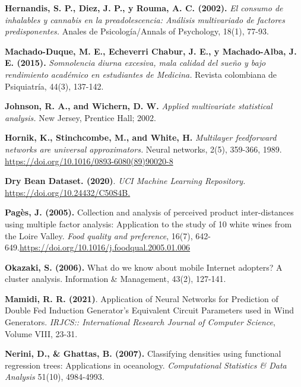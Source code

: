 \begin{thebibliography}{99}
\textbf{Hernandis, S. P., Diez, J. P., y Rouma, A. C. (2002).} \textit{El consumo de inhalables y cannabis en la preadolescencia: Análisis multivariado de factores predisponentes.} Anales de Psicología/Annals of Psychology, 18(1), 77-93.

 \textbf{Machado-Duque, M. E., Echeverri Chabur, J. E., y Machado-Alba, J. E. (2015).}\textit{ Somnolencia diurna excesiva, mala calidad del sueño y bajo rendimiento académico en estudiantes de Medicina.} Revista colombiana de Psiquiatría, 44(3), 137-142.

 \textbf{Johnson, R. A., and Wichern, D. W. } \emph{Applied multivariate statistical analysis.} New Jersey, Prentice Hall; 2002.


 \textbf{Hornik, K., Stinchcombe, M., and White, H. } \emph{Multilayer feedforward networks are universal approximators.} Neural networks, 2(5), 359-366, 1989.
\url{https://doi.org/10.1016/0893-6080(89)90020-8}

 \textbf{Dry Bean Dataset. (2020)}.\emph{ UCI Machine Learning Repository.} \url{https://doi.org/10.24432/C50S4B.}

\textbf{Pagès, J. (2005).} Collection and analysis of perceived product inter-distances using multiple factor analysis: Application to the study of 10 white wines from the Loire Valley. \emph{Food quality and preference}, 16(7), 642-649.\url{https://doi.org/10.1016/j.foodqual.2005.01.006
}

\textbf{Okazaki, S. (2006).} What do we know about mobile Internet adopters? A cluster analysis. Information \& Management, 43(2), 127-141. 

\textbf{Mamidi, R. R. (2021)}. Application of Neural Networks for Prediction of Double Fed Induction Generator’s Equivalent Circuit Parameters used in Wind Generators. \emph{IRJCS:: International Research Journal of Computer Science}, Volume VIII, 23-31.

\textbf{Nerini, D., \& Ghattas, B. (2007).} Classifying densities using functional regression trees: Applications in oceanology. \emph{Computational Statistics \& Data Analysis} 51(10), 4984-4993.


\end{thebibliography}
